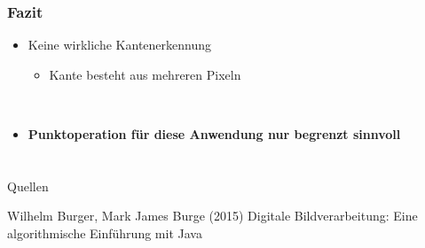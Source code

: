 \documentclass[12pt]{beamer}
\begin{document}
\begin{frame}
	\frametitle{Fazit}
	\begin{itemize}
		\item Keine wirkliche Kantenerkennung 
		\begin{itemize}
			\item Kante besteht aus mehreren Pixeln
		\end{itemize}
		\\
		\item \textbf{Punktoperation für diese Anwendung nur begrenzt sinnvoll}		
	\end{itemize}
\end{frame}

\section*{}

\begin{frame}
	
	\Large{}	
	\newline
	\begin{block}{Quellen}
		\small{	
		\begin{thebibliography}{99} %
			 Wilhelm Burger, Mark James Burge (2015)
			\newblock Digitale Bildverarbeitung: Eine algorithmische Einführung mit Java
		\end{thebibliography}
		}
	\end{block}
\end{frame}
\end{document}
